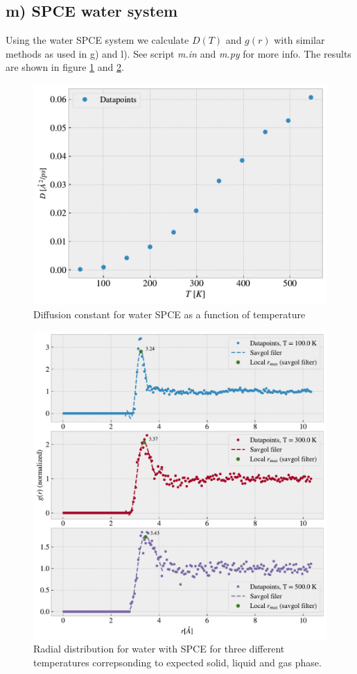 \documentclass[reprint, amsmath, amssymb, aps]{revtex4-2}
\begin{document}
\subsection*{m) SPCE water system}
Using the water SPCE system we calculate $D(T)$ and $g(r)$ with similar methods as used in g) and l). See script \textit{m.in} and \textit{m.py} for more info. The results are shown in figure \ref{fig:water_D} and \ref{fig:water_rdf}.
\begin{figure}[H]
  \includegraphics[width=\linewidth]{figures/water_D(T).pdf}
  \caption{Diffusion constant for water SPCE as a function of temperature}
  \label{fig:water_D}
\end{figure}
\begin{figure}[H]
  \includegraphics[width=\linewidth]{figures/water_rdf.pdf}
  \caption{Radial distribution for water with SPCE for three different temperatures correpsonding to expected solid, liquid and gas phase. }
  \label{fig:water_rdf}
\end{figure}
\end{document}
